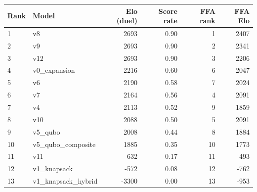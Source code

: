 \begin{tabular}{llrrrr}
\toprule
Rank & Model & Elo (duel) & Score rate & FFA rank & FFA Elo \\
\midrule
1 & v8 & 2693 & 0.90 & 1 & 2407 \\
2 & v9 & 2693 & 0.90 & 2 & 2341 \\
3 & v12 & 2693 & 0.90 & 3 & 2206 \\
4 & v0\_expansion & 2216 & 0.60 & 6 & 2047 \\
5 & v6 & 2190 & 0.58 & 7 & 2024 \\
6 & v7 & 2164 & 0.56 & 4 & 2091 \\
7 & v4 & 2113 & 0.52 & 9 & 1859 \\
8 & v10 & 2088 & 0.50 & 5 & 2091 \\
9 & v5\_qubo & 2008 & 0.44 & 8 & 1884 \\
10 & v5\_qubo\_composite & 1885 & 0.35 & 10 & 1773 \\
11 & v11 & 632 & 0.17 & 11 & 493 \\
12 & v1\_knapsack & -572 & 0.08 & 12 & -762 \\
13 & v1\_knapsack\_hybrid & -3300 & 0.00 & 13 & -953 \\
\bottomrule
\end{tabular}
